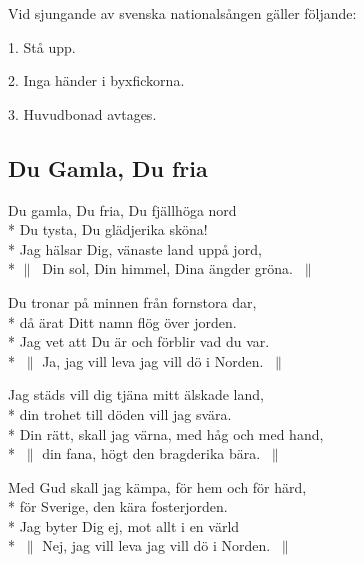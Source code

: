 

\pagestyle{Patriotiska sånger}









Vid sjungande av svenska nationalsången gäller följande:

1. Stå upp.

2. Inga händer i byxfickorna.

3. Huvudbonad avtages. 

\begin{SongText}
\subsection{\textbf{Du Gamla, Du fria}}
\begin{Verse}
Du gamla, Du fria, Du fjällhöga nord\\*%
Du tysta, Du glädjerika sköna!\\*%
Jag hälsar Dig, vänaste land uppå jord,\\*%
$\|\:$ Din sol, Din himmel, Dina ängder gröna. $\:\|$
\end{Verse}
\begin{Verse}
Du tronar på minnen från fornstora dar,\\*%
då ärat Ditt namn flög över jorden.\\*%
Jag vet att Du är och förblir vad du var.\\*%
$\:\|$ Ja, jag vill leva jag vill dö i Norden. $\:\|$
\end{Verse}
\begin{Verse}
Jag städs vill dig tjäna mitt älskade land,\\*%
din trohet till döden vill jag svära.\\*%
Din rätt, skall jag värna, med håg och med hand,\\*%
$\:\|$ din fana, högt den bragderika bära. $\:\|$
\end{Verse}
\begin{Verse}
Med Gud skall jag kämpa, för hem och för härd,\\*%
för Sverige, den kära fosterjorden.\\*%
Jag byter Dig ej, mot allt i en värld\\*%
$\:\|$ Nej, jag vill leva jag vill dö i Norden. $\:\|$
\end{Verse}
\end{SongText}

